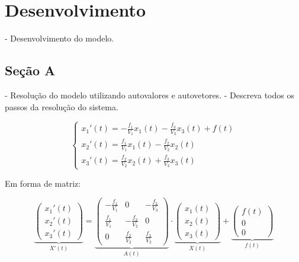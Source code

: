 \section{Desenvolvimento}

- Desenvolvimento do modelo.

\subsection{Seção A}

- Resolução do modelo utilizando autovalores e autovetores.
- Descreva todos os passos da resolução do sistema.

\begin{equation}
    \begin{cases}
      x_1'(t)=-\frac{f_1}{V_1}x_1(t)-\frac{f_3}{V_3}x_3(t)+f(t)\\
      x_2'(t)=\frac{f_1}{V_1}x_1(t)-\frac{f_2}{V_2}x_2(t)\\
      x_3'(t)=\frac{f_2}{V_2}x_2(t)+\frac{f_3}{V_3}x_3(t)
    \end{cases}
\end{equation}

Em forma de matriz:
\begin{center}

    
\begin{equation}
\renewcommand{\arraystretch}{1.8}
\underbrace{\begin{pmatrix}
    x_1'(t)\\
    x_2'(t)\\
    x_3'(t)
\end{pmatrix}}_\text{$X'(t)$}
=
\underbrace{\begin{pmatrix}
-\frac{f_1}{V_1} & 0 & -\frac{f_3}{V_3}\\
\frac{f_1}{V_1} & -\frac{f_2}{V_2} & 0\\
0 & \frac{f_2}{V_2} & \frac{f_3}{V_3}
\end{pmatrix}}_\text{$A(t)$}
\cdot
\underbrace{\begin{pmatrix}
x_1(t)\\
x_2(t)\\
x_3(t)
\end{pmatrix}}_\text{$X(t)$}
+
\underbrace{\begin{pmatrix}
f(t)\\
0\\
0
\end{pmatrix}}_\text{$f(t)$}
\end{equation}
\end{center}



